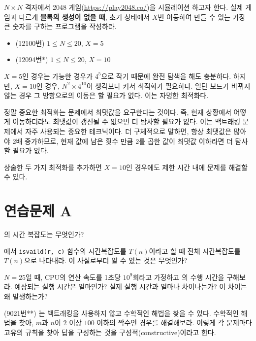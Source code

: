 \begin{example}
    $N \times N$ 격자에서 2048 게임(\url{https://play2048.co/})을 시뮬레이션 하고자 한다. 실제 게임과 다르게 \textbf{블록의 생성이 없을 때}, 초기 상태에서 $X$번 이동하여 만들 수 있는 가장 큰 숫자를 구하는 프로그램을 작성하라.
    \begin{itemize}
        \item (12100번) $1 \leq N \leq 20$, $X = 5$
        \item (12094번*) $1 \leq N \leq 20$, $X = 10$
    \end{itemize}
\end{example}

$X=5$인 경우는 가능한 경우가 $4^5$으로 작기 때문에 완전 탐색을 해도 충분하다. 하지만, $X=10$인 경우, $N^2 \times 4^{10}$이 생각보다 커서 최적화가 필요하다. 일단 보드가 바뀌지 않는 경우 그 방향으로의 이동은 할 필요가 없다. 이는 자명한 최적화다.

정말 중요한 최적화는 문제에서 최댓값을 요구한다는 것이다. 즉, 현재 상황에서 어떻게 이동하더라도 최댓값이 갱신될 수 없으면 더 탐사할 필요가 없다. 이는 백트래킹 문제에서 자주 사용되는 중요한 테크닉이다. 더 구체적으로 말하면, 항상 최댓값은 많아야 2배 증가하므로, 현재 값에 남은 횟수 만큼 2를 곱한 값이 최댓값 이하라면 더 탐사할 필요가 없다.

상술한 두 가지 최적화를 추가하면 $X=10$인 경우에도 제한 시간 내에 문제를 해결할 수 있다.

\section{연습문제 A}
\begin{problem}
    의 시간 복잡도는 무엇인가?
\end{problem}
\begin{problem}
    에서 \texttt{isvaild(r, c)} 함수의 시간복잡도를 $T(n)$이라고 할 때 전체 시간복잡도를 $T(n)$으로 나타내라. 이 사실로부터 알 수 있는 것은 무엇인가?
\end{problem}
\begin{problem}
    $N=25$일 때, CPU의 연산 속도를 1초당 $10^{9}$회라고 가정하고 의 수행 시간을 구해보라. 예상되는 실행 시간은 얼마인가? 실제 실행 시간과 얼마나 차이나는가? 이 차이는 왜 발생하는가?
\end{problem}
\begin{problem}
    (9021번**) 는 백트래킹을 사용하지 않고 수학적인 해법을 찾을 수 있다. 수학적인 해법을 찾아, $m$과 $n$이 $2$ 이상 $100$ 이하의 짝수인 경우를 해결해보라. 이렇게 각 문제마다 고유의 규칙을 찾아 답을 구성하는 것을 구성적(constructive)이라고 한다.
\end{problem}

